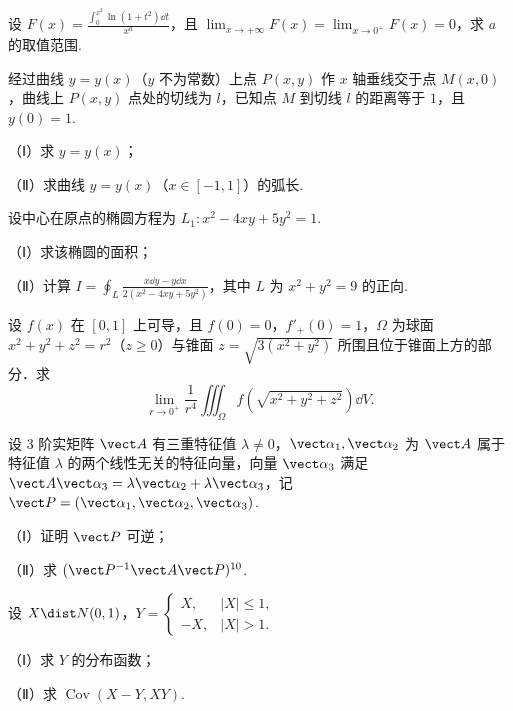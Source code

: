 \begin{question}[index=17,points=10]
设 $\displaystyle F(x)=\frac{\int_0^{x^2}\ln(1+t^2)\dd t}{x^a}$，且 $\displaystyle\lim_{x\to+\infty}F(x)=\lim_{x\to0^+}F(x)=0$，求 $a$ 的取值范围.
\end{question}
\QuestionBreak\WorkSpace

\begin{question}[index=18,points=12]
经过曲线 $y=y(x)$（$y$ 不为常数）上点 $P(x,y)$ 作 $x$ 轴垂线交于点 $M(x,0)$，曲线上 $P(x,y)$ 点处的切线为 $l$，已知点 $M$ 到切线 $l$ 的距离等于 $1$，且 $y(0)=1$.
\par（Ⅰ）求 $y=y(x)$；
\par（Ⅱ）求曲线 $y=y(x)$（$x\in[-1,1]$）的弧长.
\end{question}
\QuestionBreak\WorkSpace\WorkPageBreak

\begin{question}[index=19,points=12]
设中心在原点的椭圆方程为 $L_1:x^2-4xy+5y^2=1$.
\par（Ⅰ）求该椭圆的面积；
\par（Ⅱ）计算 $\displaystyle I=\oint_L\frac{x\dd y-y\dd x}{2(x^2-4xy+5y^2)}$，其中 $L$ 为 $x^2+y^2=9$ 的正向.
\end{question}
\QuestionBreak\WorkSpace

\begin{question}[index=20,points=12]
设 $f(x)$ 在 $[0,1]$ 上可导，且 $f(0)=0$，$f'_+(0)=1$，$\Omega$ 为球面 $x^2+y^2+z^2=r^2$（$z\ge0$）与锥面 $z=\sqrt{3(x^2+y^2)}$ 所围且位于锥面上方的部分．求
\[\lim_{r\to0^+}\frac1{r^4}\iiint_\Omega f\!\left(\sqrt{x^2+y^2+z^2}\right)\dd V.\]
\end{question}
\QuestionBreak\WorkSpace\WorkPageBreak

\begin{question}[index=21,points=12]
设 $3$ 阶实矩阵 $\vect A$ 有三重特征值 $\lambda\ne0$，$\vect\alpha_1,\vect\alpha_2$ 为 $\vect A$ 属于特征值 $\lambda$ 的两个线性无关的特征向量，向量 $\vect\alpha_3$ 满足 $\vect A\vect\alpha_3=\lambda\vect\alpha_2+\lambda\vect\alpha_3$，记 $\vect P=(\vect\alpha_1,\vect\alpha_2,\vect\alpha_3)$.
\par（Ⅰ）证明 $\vect P$ 可逆；
\par（Ⅱ）求 $(\vect P^{-1}\vect A\vect P)^{10}$.
\end{question}
\QuestionBreak\WorkSpace

\begin{question}[index=22,points=12]
设 $X\dist N(0,1)$，$Y=\begin{cases}X,&|X|\le1,\\-X,&|X|>1.\end{cases}$
\par（Ⅰ）求 $Y$ 的分布函数；
\par（Ⅱ）求 $\operatorname{Cov}(X-Y,XY)$.
\end{question}
\WorkSpace
